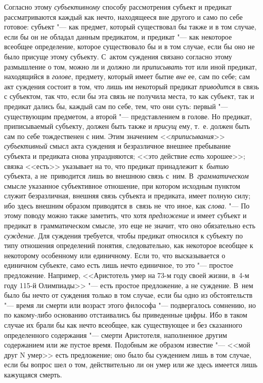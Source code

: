 Согласно этому {\em субъективному}
способу рассмотрения субъект и предикат рассматриваются
каждый как нечто, находящееся вне другого и само по себе готовое: субъект
"--- как предмет, который существовал бы также и в том случае,
если бы он не обладал данным предикатом, и предикат "--- как
некоторое всеобщее определение, которое существовало бы и в том случае,
если бы оно не было присуще этому субъекту. С~актом суждения связано
согласно этому размышление о том, можно ли и должно ли
{\em приписывать} тот или иной предикат, находящийся в
{\em голове}, предмету, который имеет бытие {\em вне}
ее, сам по себе; сам акт суждения состоит в том, что лишь им
некоторый предикат {\em приводится}
в связь с субъектом, так что, если бы эта связь не получила
места, то как субъект, так и предикат дались бы, каждый сам по себе, тем,
что они суть: первый "--- существующим предметом, а второй
"--- представлением в голове. Но предикат, приписываемый
субъекту, должен быть также и {\em присущ} ему, т.~е.
должен быть сам по себе тождественен с ним. Этим значением
<<{\em приписывания}>> {\em субъективный} смысл
акта суждения и безразличное внешнее пребывание субъекта и предиката снова
упраздняются; <<это действие {\em есть} хорошее>>; связка <<есть>> указывает
на то, что предикат принадлежит к~{\em бытию} субъекта, а не~приводится лишь
во внешнюю связь с~ним. В~{\em грамматическом} смысле указанное субъективное
отношение, при котором исходным пунктом служит безразличная, внешняя связь
субъекта и предиката, имеет полную силу; ибо здесь внешним образом приводятся
в~связь не~что иное, как {\em слова}. "--- По этому поводу можно также
заметить, что хотя {\em предложение} и имеет субъект и предикат
в~грамматическом смысле, это еще не значит, что оно обязательно есть
{\em суждение}. Для суждения требуется, чтобы предикат относился к субъекту
по типу отношения определений понятия, следовательно, как некоторое
всеобщее к некоторому особенному или единичному. Если то,
что высказывается о единичном субъекте, само есть лишь нечто единичное, то
это "--- простое предложение. Например, <<Аристотель умер на 73-м году своей
жизни, в~4-м году 115-й
Олимпиады>> "--- есть простое предложение, а не суждение. В~нем было бы нечто
от суждения только в том случае, если бы одно из обстоятельств "--- время ли
смерти или возраст этого философа "--- подвергалось сомнению, но по какому-либо
основанию отстаивались бы приведенные цифры. Ибо в таком случае их брали бы как
нечто всеобщее, как существующее и без сказанного определенного содержания "---
смерти Аристотеля, наполненное другим содержанием или же пустое время. Подобным
же образом известие "--- <<мой друг N умер>> есть предложение; оно было бы
суждением лишь в том случае, если бы вопрос шел о том, действительно ли он умер
или же здесь имеется лишь кажущаяся смерть.

